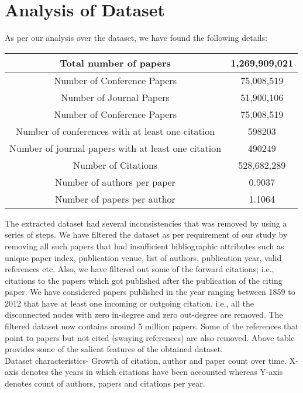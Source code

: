 \section{Analysis of Dataset}
As per our analysis over the dataset, we have found the following details:
\begin{center}
    \begin{tabular}{|c|c|}
        \hline
         Total number of papers & 1,269,909,021 \\
         \hline
         Number of Conference Papers & 75,008,519\\
         \hline
         Number of Journal Papers & 51,900,106\\
         \hline
         Number of Conference Papers & 75,008,519\\
         \hline
         Number of conferences with at least one citation & 598203\\        
         \hline
         Number of journal papers with at least one citation & 490249\\
         \hline
         Number of Citations & 528,682,289\\
         \hline
         Number of authors per paper & 0.9037\\
         \hline
         Number of papers per author & 1.1064\\
        \hline
    \end{tabular}
\end{center}

The extracted dataset had several inconsistencies that was removed by using a series of steps. We have filtered the dataset as per requirement of our study by removing all such papers that had insufficient bibliographic attributes such as unique paper index, publication venue, list of authors, publication year, valid references etc. Also, we have filtered out some of the forward citations; i.e., citations to the papers which got published after the publication of the citing paper. We have considered papers published in the year ranging between 1859 to 2012 that have at least one incoming or outgoing citation, i.e., all the disconnected nodes with zero in-degree and zero out-degree are removed. The filtered dataset now contains around 5 million papers. Some of the references that point to papers but not cited (swaying references) are also removed. Above table provides some of the salient features of the obtained dataset.\\
Dataset characteristics- Growth of citation, author and paper count over time. X-axis denotes the years in which citations have been accounted whereas Y-axis denotes count of authors, papers and citations per year.
